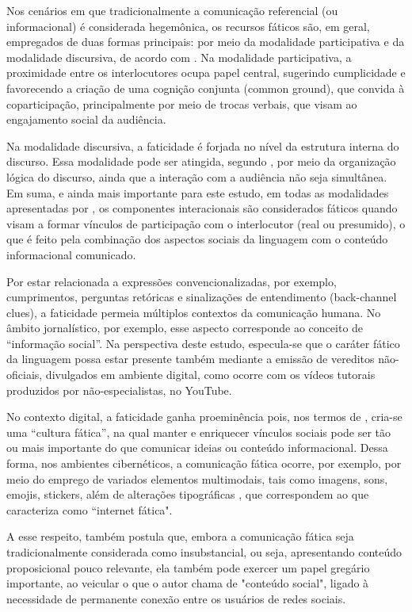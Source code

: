 \documentclass[portuguese]{textolivre}
\begin{document}
Nos cenários em que tradicionalmente a comunicação referencial (ou informacional) é considerada hegemônica, os recursos fáticos são, em geral, empregados de duas formas principais: por meio da modalidade participativa e da modalidade discursiva, de acordo com \textcite{hazaparu2015}. Na modalidade participativa, a proximidade entre os interlocutores ocupa papel central, sugerindo cumplicidade e favorecendo a criação de uma cognição conjunta (common ground), que convida à coparticipação, principalmente por meio de trocas verbais, que visam ao engajamento social da audiência. 

Na modalidade discursiva, a faticidade é forjada no nível da estrutura interna do discurso. Essa modalidade pode ser atingida, segundo \textcite{hazaparu2015}, por meio da organização lógica do discurso, ainda que a interação com a audiência não seja simultânea. Em suma, e ainda mais importante para este estudo, em todas as modalidades apresentadas por \textcite{hazaparu2015}, os componentes interacionais são considerados fáticos quando visam a formar vínculos de participação com o interlocutor (real ou presumido), o que é feito pela combinação dos aspectos sociais da linguagem com o conteúdo informacional comunicado.

Por estar relacionada a expressões convencionalizadas, por exemplo, cumprimentos, perguntas retóricas e sinalizações de entendimento (back-channel clues), a faticidade permeia múltiplos contextos da comunicação humana. No âmbito jornalístico, por exemplo, esse aspecto corresponde ao conceito de “informação social”. Na perspectiva deste estudo, especula-se que o caráter fático da linguagem possa estar presente também mediante a emissão de vereditos não-oficiais, divulgados em ambiente digital, como ocorre com os vídeos tutorais produzidos por não-especialistas, no YouTube. 

No contexto digital, a faticidade ganha proeminência pois, nos termos de \textcite[p. 395]{miller2008}, cria-se uma “cultura fática”, na qual manter e enriquecer vínculos sociais pode ser tão ou mais importante do que comunicar ideias ou conteúdo informacional. Dessa forma, nos ambientes cibernéticos, a comunicação fática ocorre, por exemplo, por meio do emprego de variados elementos multimodais, tais como imagens, sons, emojis, stickers, além de alterações tipográficas \cite{oliveira2018,cunha2020teorias,carneiro2020}, que correspondem ao que \textcite{yus2019} caracteriza como “internet fática". 

A esse respeito, \textcite{yus2019} também postula que, embora a comunicação fática seja tradicionalmente considerada como insubstancial, ou seja, apresentando conteúdo proposicional pouco relevante, ela também pode exercer um papel gregário importante, ao veicular o que o autor chama de "conteúdo social", ligado à necessidade de permanente conexão entre os usuários de redes sociais.
\end{document}

